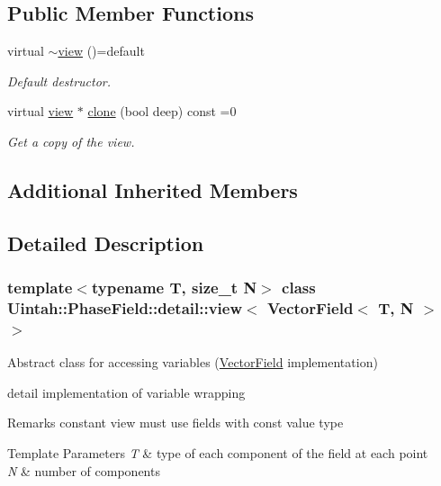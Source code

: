 \subsection*{Public Member Functions}
\begin{DoxyCompactItemize}
\item 
virtual \hyperlink{classUintah_1_1PhaseField_1_1detail_1_1view_3_01VectorField_3_01T_00_01N_01_4_01_4_a2704544caab792f68f0d115f701c0f40}{$\sim$view} ()=default
\begin{DoxyCompactList}\small\item\em Default destructor. \end{DoxyCompactList}\item 
virtual \hyperlink{classUintah_1_1PhaseField_1_1detail_1_1view}{view} $\ast$ \hyperlink{classUintah_1_1PhaseField_1_1detail_1_1view_3_01VectorField_3_01T_00_01N_01_4_01_4_a50235465cae83d2080d48dbf4a3c3597}{clone} (bool deep) const =0
\begin{DoxyCompactList}\small\item\em Get a copy of the view. \end{DoxyCompactList}\end{DoxyCompactItemize}
\subsection*{Additional Inherited Members}


\subsection{Detailed Description}
\subsubsection*{template$<$typename T, size\+\_\+t N$>$\newline
class Uintah\+::\+Phase\+Field\+::detail\+::view$<$ Vector\+Field$<$ T, N $>$ $>$}

Abstract class for accessing variables (\hyperlink{structUintah_1_1PhaseField_1_1VectorField}{Vector\+Field} implementation) 

detail implementation of variable wrapping

\begin{DoxyRemark}{Remarks}
constant view must use fields with const value type
\end{DoxyRemark}

\begin{DoxyTemplParams}{Template Parameters}
{\em T} & type of each component of the field at each point \\
\hline
{\em N} & number of components \\
\hline
\end{DoxyTemplParams}


